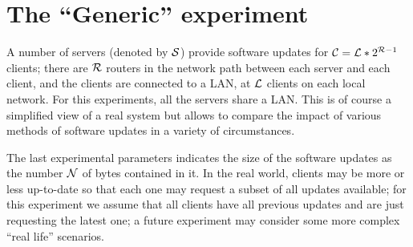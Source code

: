 \documentclass[a4paper,12pt]{article}
\begin{document}
\section{The ``Generic'' experiment}
\label{GEN:experiment}

A number of servers (denoted by $\cal S$) provide software updates for
${\cal C} = {\cal L} * 2^{{\cal R} - 1}$ clients; there are ${\cal R}$ routers
in the network path between each server and each client, and the clients
are connected to a LAN, at ${\cal L}$ clients on each local network.
For this experiments, all the servers share a LAN.
This is of course a simplified view of a real system but allows to
compare the impact of various methods of software updates in a variety
of circumstances.

The last experimental parameters indicates the size of the software updates
as the number ${\cal N}$ of bytes contained in it.  In the real world,
clients may be more or less up-to-date so that each one may request a
subset of all updates available; for this experiment we assume that
all clients have all previous updates and are just requesting the latest
one; a future experiment may consider some more complex ``real life''
scenarios.
\end{document}
